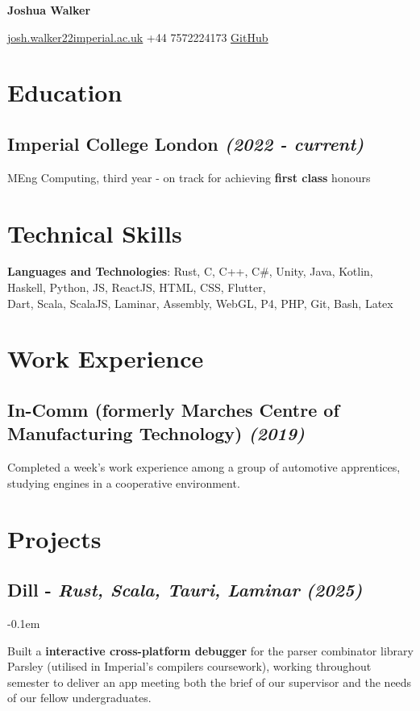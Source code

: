 \documentclass{article}
\makeatletter
\newcommand{\contact}[1]{\normalsize{#1}}
\newcommand{\contactdiv}{\hspace*{0.8em}}
\newcommand{\email}[2]{\href{mailto:#1@#2}{\underline{#1{\small\fontfamily{phv}\selectfont@}#2}}}
\newcommand{\github}{\href{https://github.com/josh-ja-walker}{\underline{GitHub}}}
\newcommand{\dates}[1]{\hfill\textit{(#1)}}
\newcommand{\indentsubsection}[2]{
    \subsection*{#1}
    #2
}
\newcommand{\project}[4]{
    \indentsubsection{\textbf{#1} - \textit{#3} \dates{#2}}
    \vspace{-0.1em}
    \begin{minipage}{\dimexpr\textwidth}%
        #4
    \end{minipage}    
    \hfill
    \vspace{-0.2em}
}
\makeatother
\begin{document}

\begin{center}
    \vspace{0.20em}
    
    {\LARGE\textbf{Joshua Walker}}\\
    
    \vspace{0.65em}
    
    \contact{\email{josh.walker22}{imperial.ac.uk}}
    \contactdiv
    \contact{+44 7572224173}
    \contactdiv
    \github

\end{center}

    
\section*{Education}

\indentsubsection{\textbf{Imperial College London} \dates{2022 - current}}{
    MEng Computing, third year - on track for achieving \textbf{first class} honours
}


\section*{Technical Skills}

\textbf{Languages and Technologies}: 
    Rust, C, C++, C\#, Unity, Java, Kotlin, Haskell, Python, JS, ReactJS, HTML, CSS, Flutter, \vspace{0.25em}\\
    \indent Dart, Scala, ScalaJS, Laminar, Assembly, WebGL, P4, PHP, Git, Bash, Latex


\section*{Work Experience}

\indentsubsection{\textbf{In-Comm} (formerly Marches Centre of Manufacturing Technology) \dates{2019}}{
    Completed a week's work experience among a group of automotive apprentices, studying engines in a cooperative environment.
}


\section*{Projects}

\project{Dill }{2025}{Rust, Scala, Tauri, Laminar}{
    Built a \textbf{interactive cross-platform debugger} for the parser combinator library Parsley (utilised in Imperial's compilers coursework), 
    working throughout semester to deliver an app meeting both the brief of our supervisor and the needs of our fellow undergraduates.
}
\end{document}
